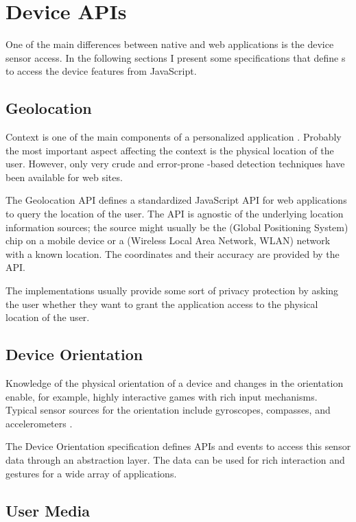 \section{Device APIs}

One of the main differences between native and web applications is the
device sensor access. In the following sections I present some
specifications that define s to access the device features
from JavaScript.

\subsection{Geolocation}

Context is one of the main components of a personalized application
\cite{fling2009mobile}. Probably the most important aspect affecting
the context is the physical location of the user. However, only very
crude and error-prone -based detection techniques have been
available for web sites.

The Geolocation API defines a standardized JavaScript API for web
applications to query the location of the user. The API is agnostic of
the underlying location information sources; the source might usually
be the  (Global Positioning System) chip on a mobile device
or a  (Wireless Local Area Network, WLAN) network with a
known location. The coordinates and their accuracy are provided by the
API. \cite{geolocationAPI}

The implementations usually provide some sort of privacy protection by
asking the user whether they want to grant the application access to
the physical location of the user.

\subsection{Device Orientation}

Knowledge of the physical orientation of a device and changes in the
orientation enable, for example, highly interactive games with rich
input mechanisms. Typical sensor sources for the orientation include
gyroscopes, compasses, and accelerometers \cite{DeviceOrientation}.

The Device Orientation specification \cite{DeviceOrientation} defines
APIs and events to access this sensor data through an abstraction
layer. The data can be used for rich interaction and gestures for a
wide array of applications.

\subsection{User Media}
\label{section:getusermedia}

